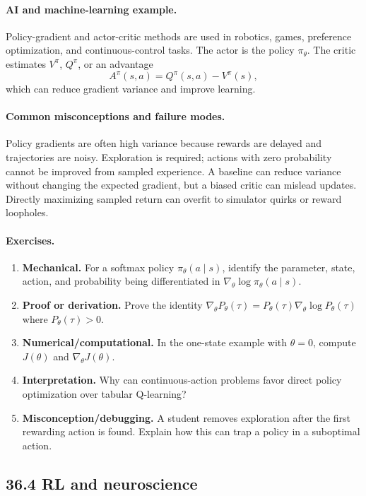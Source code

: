 \paragraph{AI and machine-learning example.}
Policy-gradient and actor-critic methods are used in robotics, games, preference optimization, and continuous-control tasks. The actor is the policy \(\pi_\theta\). The critic estimates \(V^\pi\), \(Q^\pi\), or an advantage
\[
A^\pi(s,a)=Q^\pi(s,a)-V^\pi(s),
\]
which can reduce gradient variance and improve learning.

\paragraph{Common misconceptions and failure modes.}
Policy gradients are often high variance because rewards are delayed and trajectories are noisy. Exploration is required; actions with zero probability cannot be improved from sampled experience. A baseline can reduce variance without changing the expected gradient, but a biased critic can mislead updates. Directly maximizing sampled return can overfit to simulator quirks or reward loopholes.

\paragraph{Exercises.}
\begin{enumerate}[label=\textbf{36.3.\arabic*.}, leftmargin=*]
\item \textbf{Mechanical.} For a softmax policy \(\pi_\theta(a\mid s)\), identify the parameter, state, action, and probability being differentiated in \(\nabla_\theta\log\pi_\theta(a\mid s)\).
\item \textbf{Proof or derivation.} Prove the identity \(\nabla_\theta P_\theta(\tau)=P_\theta(\tau)\nabla_\theta\log P_\theta(\tau)\) where \(P_\theta(\tau)>0\).
\item \textbf{Numerical/computational.} In the one-state example with \(\theta=0\), compute \(J(\theta)\) and \(\nabla_\theta J(\theta)\).
\item \textbf{Interpretation.} Why can continuous-action problems favor direct policy optimization over tabular Q-learning?
\item \textbf{Misconception/debugging.} A student removes exploration after the first rewarding action is found. Explain how this can trap a policy in a suboptimal action.
\end{enumerate}

\subsection{36.4 RL and neuroscience}

